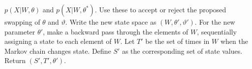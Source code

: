 \begin{algorithm}[H]
\begin{algorithmic}[1]
    $p(X|W,\theta)$ and $p(X|W,\theta^*)$. Use these to accept or reject the
    proposed swapping of $\theta$ and $\vartheta$. Write the new state space
    as $(W,\theta',\vartheta')$.
    \State For the new parameter $\theta'$, make a backward pass through 
    the elements of
    $W$, sequentially assigning a state to each element of $W$.
    \State Let $T'$ be the set of times in $W$ when the Markov chain changes state. Define $S'$ as the corresponding set of state values. Return $(S', T', \theta')$.
\end{algorithmic}
\end{algorithm}

